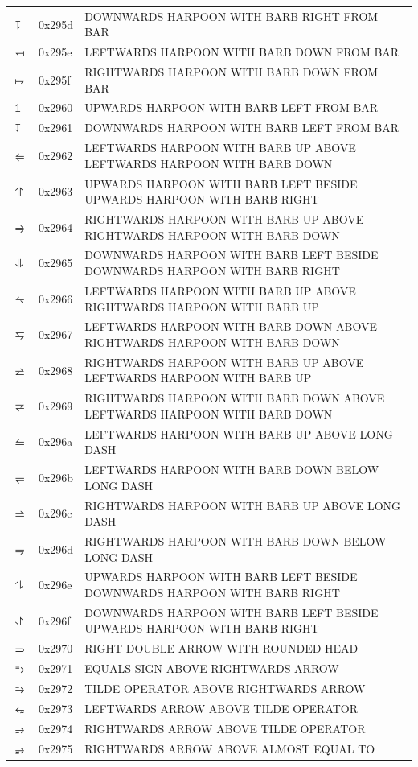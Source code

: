 \documentclass[12pt, twoside]{article}
\begin{document}
\begin{longtable}{L{1.0cm} L{2.0cm} >{\footnotesize}L{10cm}}
$⥝$&0x295d&DOWNWARDS HARPOON WITH BARB RIGHT FROM BAR\\
$⥞$&0x295e&LEFTWARDS HARPOON WITH BARB DOWN FROM BAR\\
$⥟$&0x295f&RIGHTWARDS HARPOON WITH BARB DOWN FROM BAR\\
$⥠$&0x2960&UPWARDS HARPOON WITH BARB LEFT FROM BAR\\
$⥡$&0x2961&DOWNWARDS HARPOON WITH BARB LEFT FROM BAR\\
$⥢$&0x2962&LEFTWARDS HARPOON WITH BARB UP ABOVE LEFTWARDS HARPOON WITH BARB DOWN\\
$⥣$&0x2963&UPWARDS HARPOON WITH BARB LEFT BESIDE UPWARDS HARPOON WITH BARB RIGHT\\
$⥤$&0x2964&RIGHTWARDS HARPOON WITH BARB UP ABOVE RIGHTWARDS HARPOON WITH BARB DOWN\\
$⥥$&0x2965&DOWNWARDS HARPOON WITH BARB LEFT BESIDE DOWNWARDS HARPOON WITH BARB RIGHT\\
$⥦$&0x2966&LEFTWARDS HARPOON WITH BARB UP ABOVE RIGHTWARDS HARPOON WITH BARB UP\\
$⥧$&0x2967&LEFTWARDS HARPOON WITH BARB DOWN ABOVE RIGHTWARDS HARPOON WITH BARB DOWN\\
$⥨$&0x2968&RIGHTWARDS HARPOON WITH BARB UP ABOVE LEFTWARDS HARPOON WITH BARB UP\\
$⥩$&0x2969&RIGHTWARDS HARPOON WITH BARB DOWN ABOVE LEFTWARDS HARPOON WITH BARB DOWN\\
$⥪$&0x296a&LEFTWARDS HARPOON WITH BARB UP ABOVE LONG DASH\\
$⥫$&0x296b&LEFTWARDS HARPOON WITH BARB DOWN BELOW LONG DASH\\
$⥬$&0x296c&RIGHTWARDS HARPOON WITH BARB UP ABOVE LONG DASH\\
$⥭$&0x296d&RIGHTWARDS HARPOON WITH BARB DOWN BELOW LONG DASH\\
$⥮$&0x296e&UPWARDS HARPOON WITH BARB LEFT BESIDE DOWNWARDS HARPOON WITH BARB RIGHT\\
$⥯$&0x296f&DOWNWARDS HARPOON WITH BARB LEFT BESIDE UPWARDS HARPOON WITH BARB RIGHT\\
$⥰$&0x2970&RIGHT DOUBLE ARROW WITH ROUNDED HEAD\\
$⥱$&0x2971&EQUALS SIGN ABOVE RIGHTWARDS ARROW\\
$⥲$&0x2972&TILDE OPERATOR ABOVE RIGHTWARDS ARROW\\
$⥳$&0x2973&LEFTWARDS ARROW ABOVE TILDE OPERATOR\\
$⥴$&0x2974&RIGHTWARDS ARROW ABOVE TILDE OPERATOR\\
$⥵$&0x2975&RIGHTWARDS ARROW ABOVE ALMOST EQUAL TO\\

\end{longtable}
\end{document}
